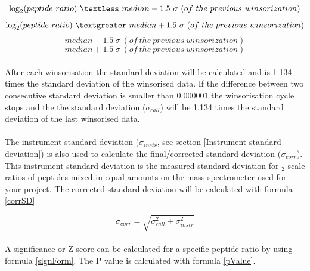 \documentclass[11pt,a4paper,oneside,notitlepage]{book}
\begin{document}
\begin{equation}
\log _{2} (peptide \ ratio) \ \textless  \ median - 1.5 \  \sigma  \ (of  \  the  \ previous \  winsorization)
\label{winsor1} 
\end{equation}
\begin{equation}
\log _{2} (peptide \ ratio) \  \textgreater  \ median + 1.5 \  \sigma  \ (of  \ the  \ previous \  winsorization)
\label{winsor2} 
\end{equation}
\begin{equation}
median - 1.5  \ \sigma  \ (of \  the  \ previous \  winsorization)
\label{winsor3} 
\end{equation}
\begin{equation}
median + 1.5 \  \sigma  \ (of  \ the \  previous \  winsorization)
\label{winsor4} 
\end{equation}

\paragraph{}After each winsorisation the standard deviation will be calculated and is 1.134 times the standard deviation of the winsorised data. If the difference between two consecutive standard deviation is smaller than 0.000001 the winsorisation cycle stops and the the standard deviation ($\sigma_{call}$) will be 1.134 times the standard deviation of the last winsorised data. 

\paragraph{}The instrument standard deviation ($\sigma_{instr}$, see section \ref{Instrument standard deviation}) is also used to calculate the final/corrected standard deviation ($\sigma_{corr}$). This instrument standard deviation is the measured standard deviation for \log$_{2}$ scale ratios of peptides mixed in equal amounts on the mass spectrometer used for your project. The corrected standard deviation will be calculated with formula \ref{corrSD}

\begin{equation}
\sigma_{corr} = \sqrt{\sigma_{call}^{2} + \sigma_{instr}^{2}}
\label{corrSD} 
\end{equation}

\paragraph{}A significance or Z-score can be calculated for a specific peptide ratio by using formula \ref{signForm}. The P value is calculated with formula \ref{pValue}. 
\end{document}
